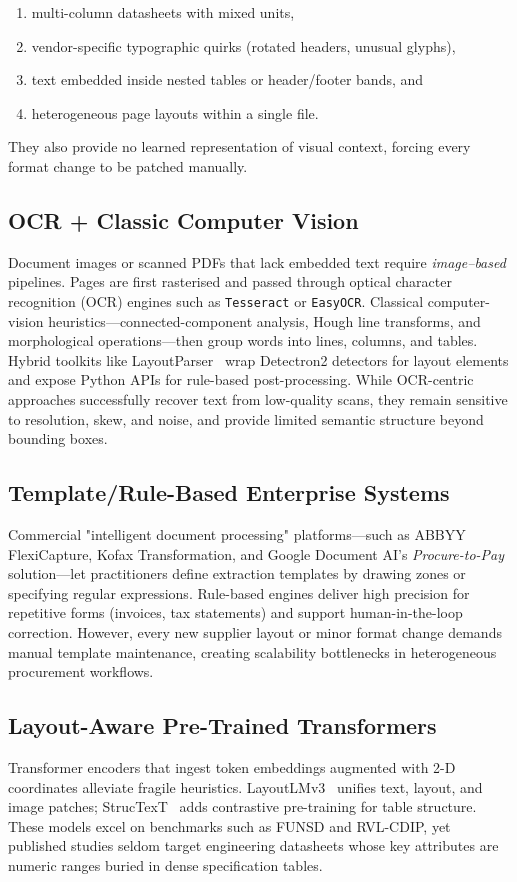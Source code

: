 \begin{enumerate}
  \item multi-column datasheets with mixed units,
  \item vendor-specific typographic quirks (rotated headers, unusual glyphs),
  \item text embedded inside nested tables or header/footer bands, and
  \item heterogeneous page layouts within a single file.
\end{enumerate}

They also provide no learned representation of visual context, forcing every
format change to be patched manually.

\subsection{OCR + Classic Computer Vision}
Document images or scanned PDFs that lack embedded text require \emph{image–based} pipelines. Pages are first rasterised and passed through optical character recognition (OCR) engines such as \texttt{Tesseract} or \texttt{EasyOCR}. Classical computer-vision heuristics—connected-component analysis, Hough line transforms, and morphological operations—then group words into lines, columns, and tables. Hybrid toolkits like LayoutParser~\cite{shen2021layoutparser} wrap Detectron2 detectors for layout elements and expose Python APIs for rule-based post-processing. While OCR-centric approaches successfully recover text from low-quality scans, they remain sensitive to resolution, skew, and noise, and provide limited semantic structure beyond bounding boxes.

\subsection{Template/Rule-Based Enterprise Systems}
Commercial "intelligent document processing" platforms—such as ABBYY FlexiCapture, Kofax Transformation, and Google Document AI's \emph{Procure-to-Pay} solution—let practitioners define extraction templates by drawing zones or specifying regular expressions. Rule-based engines deliver high precision for repetitive forms (invoices, tax statements) and support human-in-the-loop correction. However, every new supplier layout or minor format change demands manual template maintenance, creating scalability bottlenecks in heterogeneous procurement workflows.

\subsection{Layout-Aware Pre-Trained Transformers}
Transformer encoders that ingest token embeddings augmented with 2-D
coordinates alleviate fragile heuristics.
LayoutLMv3~\cite{xuhuang2022layoutlmv3} unifies text, layout, and image
patches; StrucTexT~\cite{li2021structext} adds contrastive pre-training for
table structure.
These models excel on benchmarks such as FUNSD and RVL-CDIP, yet published
studies seldom target engineering datasheets whose key attributes are numeric
ranges buried in dense specification tables.

